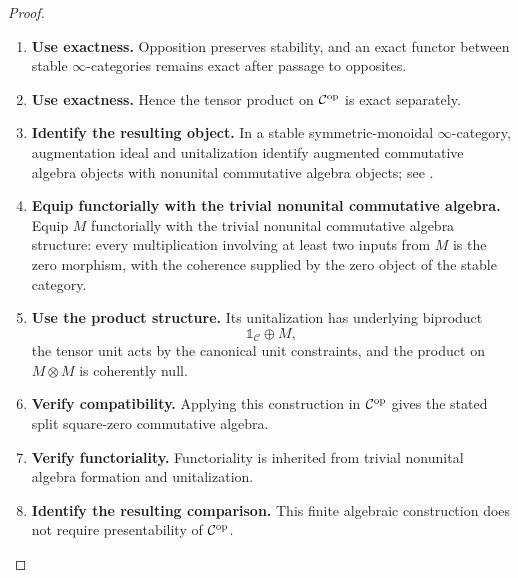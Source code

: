 \begin{proof}
\leavevmode
\begin{enumerate}[label=\textup{(\arabic*)}]
    \item \textbf{Use exactness.}
    Opposition preserves stability, and an exact functor between stable \(\infty\)-categories
    remains exact after passage to opposites.

    \item \textbf{Use exactness.}
    Hence the tensor product on \(\mathcal C^{\mathrm{op}}\) is exact separately.

    \item \textbf{Identify the resulting object.}
    In a stable symmetric-monoidal \(\infty\)-category, augmentation ideal and unitalization
    identify augmented commutative algebra objects with nonunital commutative algebra objects;
    see \cite[Proposition~5.4.4.10]{LurieHigherAlgebra}.

    \item \textbf{Equip functorially with the trivial nonunital commutative algebra.}
    Equip \(M\) functorially with the trivial nonunital commutative algebra structure:
    every multiplication involving at least two inputs from \(M\) is the zero morphism,
    with the coherence supplied by the zero object of the stable category.

    \item \textbf{Use the product structure.}
    Its unitalization has underlying biproduct
    \[
        \mathbb 1_{\mathcal C}\oplus M,
    \]
    the tensor unit acts by the canonical unit constraints, and the product on \(M\otimes M\) is
    coherently null.

    \item \textbf{Verify compatibility.}
    Applying this construction in \(\mathcal C^{\mathrm{op}}\) gives the stated split square-zero commutative
    algebra.

    \item \textbf{Verify functoriality.}
    Functoriality is inherited from trivial nonunital algebra formation and unitalization.

    \item \textbf{Identify the resulting comparison.}
    This finite algebraic construction does not require presentability of \(\mathcal C^{\mathrm{op}}\).
\end{enumerate}
\end{proof}

